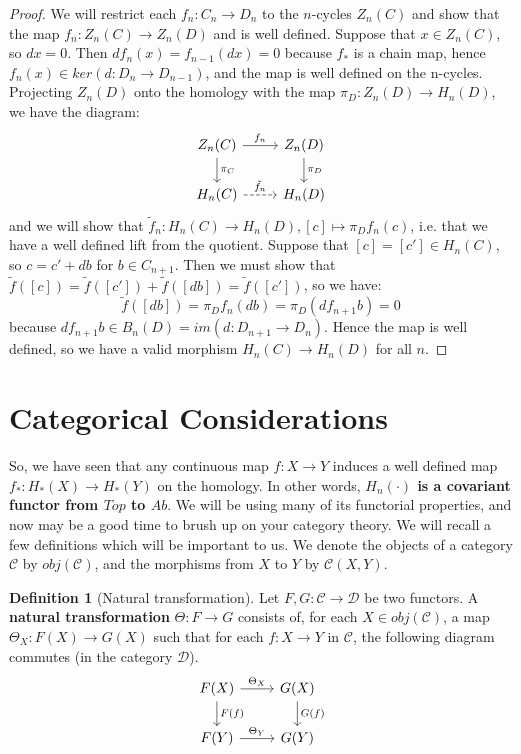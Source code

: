 \documentclass[11pt, oneside]{amsart}   	%
\theoremstyle{definition}
\newtheorem{definition}{Definition}[section]
\begin{document}
\begin{proof}
	We will restrict each $f_n : C_n\rightarrow D_n$ to the $n$-cycles $Z_n(C)$ and show that the map $f_n : Z_n(C)
	\rightarrow Z_n(D)$ and is well defined. Suppose that $x\in Z_n(C)$, so $dx = 0$. Then $df_n(x) = f_{n - 1}(dx) = 0$ 
	because $f_*$ is a chain map, hence $f_n(x)\in ker (d : D_n\rightarrow D_{n - 1})$, and the map is well defined on the 
	n-cycles. Projecting $Z_n(D)$ onto the homology with the map $\pi_D : Z_n(D)\rightarrow H_n(D)$, we have the 
	diagram:
	\begin{equation}\begin{tikzcd}
		Z_n(C)\arrow[d, "\pi_C"]\arrow[r, "f_n"] & Z_n(D)\arrow[d, "\pi_D"] \\
		H_n(C)\arrow[r, dashed, "\tilde f_n"] & H_n(D)
	\end{tikzcd}\end{equation}
	and we will show that $\tilde f_n : H_n(C)\rightarrow H_n(D), [c]\mapsto \pi_D f_n(c)$, i.e. that we have a well defined 
	lift from the quotient. Suppose that $[c] = [c']\in H_n(C)$, so $c = c' + db$ for $b\in C_{n + 1}$. Then we must show that 
	$\tilde f([c]) = \tilde f([c']) + \tilde f([db]) = \tilde f([c'])$, so we have:
	\begin{equation}
		\tilde f([db]) = \pi_D f_n(db) = \pi_D (d f_{n + 1}b) = 0
	\end{equation}
	because $df_{n + 1} b\in B_n(D) = im(d : D_{n + 1}\rightarrow D_n)$. Hence the map is well defined, so we have a 
	valid morphism $H_n(C)\rightarrow H_n(D)$ for all $n$. 
\end{proof}

\newpage
\section{Categorical Considerations}

So, we have seen that any continuous map $f : X\rightarrow Y$ induces a well defined map $f_* : H_*(X)\rightarrow H_*(Y)$ 
on the homology. In other words, \textbf{$H_n(\cdot)$ is a covariant functor from $Top$ to $Ab$}. We will be using many 
of its functorial properties, and now may be a good time to brush up on your category theory. We will recall a few definitions 
which will be important to us. We denote the objects of a category $\mathcal C$ by $obj(\mathcal C)$, and the morphisms 
from $X$ to $Y$ by $\mathcal C(X, Y)$. 

\begin{definition}[Natural transformation]
	Let $F, G : \mathcal C\rightarrow\mathcal D$ be two functors. A \textbf{natural transformation} $\Theta : F\rightarrow G$ 
	consists of, for each $X\in obj(\mathcal C)$, a map $\Theta_X : F(X)\rightarrow G(X)$ such that for each 
	$f : X\rightarrow Y$ in $\mathcal C$, the following diagram commutes (in the category $\mathcal D$). 
	\begin{equation}\begin{tikzcd}
		F(X)\arrow[r, "\Theta_X"]\arrow[d, "F(f)"] & G(X)\arrow[d, "G(f)"] \\
		F(Y)\arrow[r, "\Theta_Y"] & G(Y)
	\end{tikzcd}\end{equation}
\end{definition}
\end{document}

